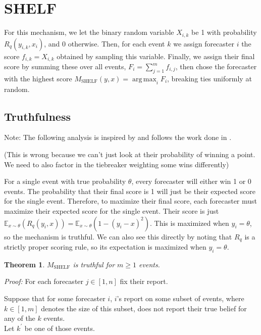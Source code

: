 \documentclass[letterpaper,12pt]{article}
\DeclareMathOperator*{\argmax}{arg\,max}
\newcommand{\E}{\mathbb{E}}
\newcommand{\1}{\mathbbm{1}}
\newtheorem{theorem}{Theorem}
\begin{document}
\section{SHELF}
\newcommand{\shelf}{M_{\mathrm{SHELF}}}

For this mechanism, we let the binary random variable $X_{i, k}$ be 1 with probability $R_q(y_{i, k}, x_i)$, and 0 otherwise. Then, for each event $k$ we assign forecaster $i$ the score $f_{i, k} = X_{i, k}$ obtained by sampling this variable. Finally, we assign their final score by summing these over all events, $F_i = \sum_{j=1}^m f_{i, j}$, then chose the forecaster with the highest score $\shelf(y, x) = \argmax_i F_i$, breaking ties uniformly at random. 

\subsection{Truthfulness}
Note: The following analysis is inspired by and follows the work done in \citet{witkowski2018incentive}.


(This is wrong because we can't just look at their probability of winning a point. We need to also factor in the tiebreaker weighting some wins differently)

For a single event with true probability $\theta$, every forecaster will either win 1 or 0 events. The probability that their final score is 1 will just be their expected score for the single event. Therefore, to maximize their final score, each forecaster must maximize their expected score for the single event. Their score is just $\E_{x \sim \theta}(R_q(y_i, x)) = \E_{x \sim \theta}(1 - (y_i - x)^2)$. This is maximized when $y_i = \theta$, so the mechanism is truthful. We can also see this directly by noting that $R_q$ is a strictly proper scoring rule, so its expectation is maximized when $y_i = \theta$. 

\begin{theorem}
  \label{shelf_truthful}
    $\shelf$ is truthful for $m \geq 1$ events.
\end{theorem}
\emph{Proof:} For each forecaster $j \in [1, n]$ fix their report.

Suppose that for some forecaster $i$, $i$'s report on some subset of events, where $k \in [1, m]$ denotes the size of this subset, does not report their true belief for any of the $k$ events.\\
Let $k^\prime$ be one of those events.
\end{document}
